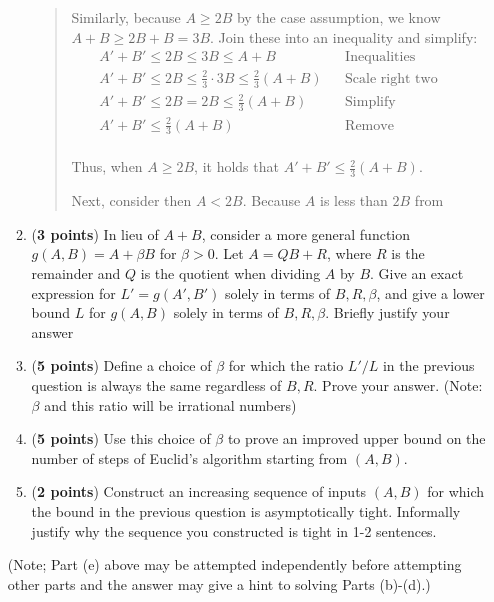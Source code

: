 \documentclass[11pt]{article}
\begin{document}
\begin{enumerate}[leftmargin=*]
\begin{enumerate}
\begin{quote}
        Similarly, because $A \geq 2B$ by the case assumption, we know $A + B \geq 2B + B = 3B$. Join these into an inequality and simplify:
        \begin{align*}
            && A' + B' \leq 2B \leq 3B \leq A + B && \text{Inequalities determined above} && \\
            && A' + B' \leq 2B \leq \frac{2}{3} \cdot 3B \leq \frac{2}{3}(A + B) && \text{Scale right two terms} && \\
            && A' + B' \leq 2B = 2B \leq \frac{2}{3}(A + B) && \text{Simplify} && \\
            && A' + B' \leq \frac{2}{3}(A + B) && \text{Remove intermediate terms} && \\
        \end{align*} 

        Thus, when $A \geq 2B$, it holds that $A' + B' \le \frac{2}{3}(A + B)$. 

        \medskip
        Next, consider then $A < 2B$. Because $A$ is less than $2B$ from 

      \end{quote}
    \item (\textbf{3 points}) In lieu of $A+B$, consider a more general function $g(A,B) = A + \beta B$ for $\beta > 0$. Let $A = QB+R$, where $R$ is the remainder and $Q$ is the quotient when dividing $A$ by $B$. Give an exact expression for $L' = g(A',B')$ solely in terms of $B,R,\beta$, and give a lower bound $L$ for $g(A,B)$ solely in terms of $B, R, \beta$. Briefly justify your answer
    \item (\textbf{5 points}) Define a choice of $\beta$ for which the ratio $L'/L$ in the previous question is always the same regardless of $B,R$. Prove your answer. (Note: $\beta$ and this ratio will be irrational numbers)
    \item (\textbf{5 points}) Use this choice of $\beta$ to prove an improved upper bound on the number of steps of Euclid's algorithm starting from $(A,B)$.
    \item (\textbf{2 points}) Construct an increasing sequence of inputs $(A,B)$ for which the bound in the previous question is asymptotically tight. Informally justify why the sequence you constructed is tight in 1-2 sentences.
\end{enumerate}
(Note; Part (e) above may be attempted independently before attempting other parts and the answer may give a hint to solving Parts (b)-(d).)



\end{enumerate}
\end{document}

